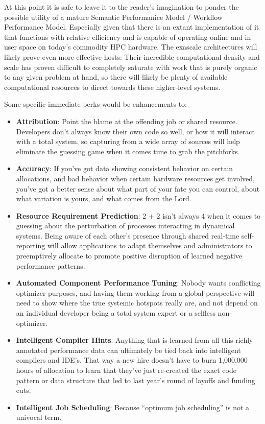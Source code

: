 At this point it is safe to leave it to the reader's imagination to
ponder the possible utility of a mature Semantic Performanice Model /
Workflow Performance Model.
%
Especially given that there is an extant implementation of it that
functions with relative efficiency and is capable of operating online
and in user space on today's commodity HPC hardware.
%
The exascale architectures will likely prove even more effective
hosts: Their incredible computational density and scale has proven
difficult to completely saturate with work that is purely organic to
any given problem at hand, so there will likely be plenty of available
computational resources to direct towards these higher-level systems.

Some specific immediate perks would be enhancements to:
%
\begin{itemize}
    \item \textbf{Attribution}: Point the blame at the offending job
      or shared resource.
      Developers don't always know their own code so well, or how it
      will interact with a total system, so capturing from a wide
      array of sources will help eliminate the guessing game when it
      comes time to grab the pitchforks.
    \item \textbf{Accuracy}: If you've got data showing consistent behavior on
      certain allocations, and bad behavior when certain hardware resources
      get involved, you've got a better sense about what part of your
      fate you can control, about what variation is yours, and what comes
      from the Lord.
    \item \textbf{Resource Requirement Prediction}: 2 + 2 isn't always
      4 when it comes to guessing about the perturbation of processes
      interacting in dynamical systems.
      Being aware of each other's presence through shared real-time
      self-reporting will allow applications to adapt themselves and
      administrators to preemptively allocate to promote positive
      disruption of learned negative performance patterns.
    \item \textbf{Automated Component Performance Tuning}: Nobody
      wants conflicting optimizer purposes, and having them working
      from a global perspective will need to show where the true
      systemic hotspots really are, and not depend on an individual
      developer being a total system expert or a selfless
      non-optimizer.
    \item \textbf{Intelligent Compiler Hints}: Anything that is learned from all
      this richly annotated performance data can ultimately be tied back
      into intelligent compilers and IDE's.
      That way a new hire doesn't have to burn 1,000,000 hours of
      allocation to learn that they've just re-created the exact code
      pattern or data structure that led to last year's round of
      layoffs and funding cuts.
    \item \textbf{Intelligent Job Scheduling}: Because ``optimum job
      scheduling'' is not a univocal term.
\end{itemize}


